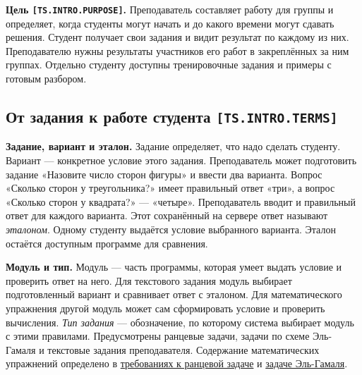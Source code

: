 \documentclass[12pt,a4paper]{article}
\begin{document}
\hypertarget{ts-intro-purpose}{} \textbf{Цель \texttt{[TS.\allowbreak{}INTRO.\allowbreak{}PURPOSE]}.} Преподаватель составляет работу для группы и определяет, когда студенты могут начать и до какого времени могут сдавать решения. Студент получает свои задания и видит результат по каждому из них. Преподавателю нужны результаты участников его работ в закреплённых за ним группах. Отдельно студенту доступны тренировочные задания и примеры с готовым разбором.

\subsection{\texorpdfstring{От задания к работе студента \texttt{[TS.\allowbreak{}INTRO.\allowbreak{}TERMS]}}{От задания к работе студента }}\label{ux43eux442-ux437ux430ux434ux430ux43dux438ux44f-ux43a-ux440ux430ux431ux43eux442ux435-ux441ux442ux443ux434ux435ux43dux442ux430-tsintroterms}

\hypertarget{от-задания-к-работе-студента-tsintroterms}{}

\hypertarget{ts-intro-terms}{}

\textbf{Задание, вариант и эталон.} Задание определяет, что надо сделать студенту. Вариант --- конкретное условие этого задания. Преподаватель может подготовить задание «Назовите число сторон фигуры» и ввести два варианта. Вопрос «Сколько сторон у треугольника?» имеет правильный ответ «три», а вопрос «Сколько сторон у квадрата?» --- «четыре». Преподаватель вводит и правильный ответ для каждого варианта. Этот сохранённый на сервере ответ называют \emph{эталоном}. Одному студенту выдаётся условие выбранного варианта. Эталон остаётся доступным программе для сравнения.

\textbf{Модуль и тип.} Модуль --- часть программы, которая умеет выдать условие и проверить ответ на него. Для текстового задания модуль выбирает подготовленный вариант и сравнивает ответ с эталоном. Для математического упражнения другой модуль может сам сформировать условие и проверить вычисления. \emph{Тип задания} --- обозначение, по которому система выбирает модуль с этими правилами. Предусмотрены ранцевые задачи, задачи по схеме Эль-Гамаля и текстовые задания преподавателя. Содержание математических упражнений определено в {\hyperlink{ts-req-func-prob-backpack-si}{требованиях к ранцевой задаче}} и {\hyperlink{ts-req-func-prob-elgamal}{задаче Эль-Гамаля}}.
\end{document}
